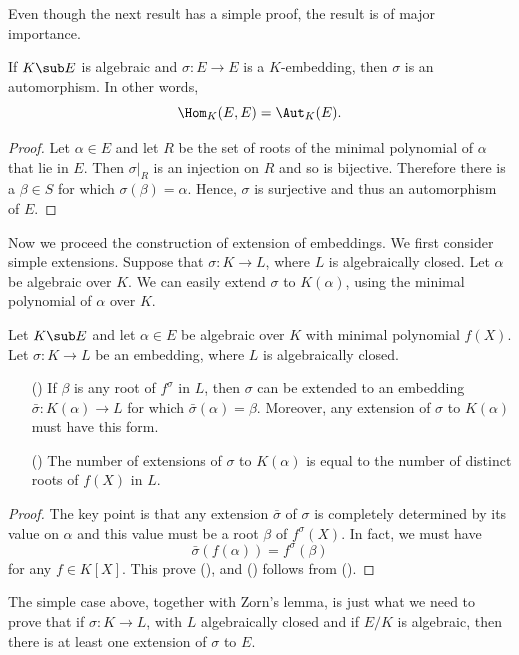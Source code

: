Even though the next result has a simple proof, the result is of major
importance.
\begin{theorem}\label{field ext algebraic Hom=Aut}
If $K\sub E$ is algebraic and $\sigma:E\to E$ is a $K$-embedding, then $\sigma$ is an automorphism. In other words,
\[\Hom_K(E,E)=\Aut_K(E).\]
\end{theorem}
\begin{proof}
Let $\alpha\in E$ and let $R$ be the set of roots of the minimal polynomial of $\alpha$ that lie in $E$. Then $\sigma|_R$ is an injection on $R$ and so is bijective. Therefore there is a $\beta\in S$ for which $\sigma(\beta)=\alpha$. Hence, $\sigma$ is surjective and thus an automorphism of $E$.
\end{proof}
Now we proceed the construction of extension of embeddings. We first consider simple extensions. Suppose that $\sigma:K\to L$, where $L$ is algebraically closed. Let $\alpha$ be algebraic over $K$. We can easily extend $\sigma$ to $K(\alpha)$, using the minimal polynomial of $\alpha$ over $K$.
\begin{proposition}\label{field embedding ext simple case}
Let $K\sub E$ and let $\alpha\in E$ be algebraic over $K$ with minimal polynomial $f(X)$. Let $\sigma:K\to L$ be an embedding, where $L$ is algebraically closed.
\begin{itemize}
\item[(\rmnum{1})] If $\beta$ is any root of $f^\sigma$ in $L$, then $\sigma$ can be extended to an embedding $\bar{\sigma}:K(\alpha)\to L$ for which $\bar{\sigma}(\alpha)=\beta$. Moreover, any extension of $\sigma$ to $K(\alpha)$ must have this form.
\item[(\rmnum{2})] The number of extensions of $\sigma$ to $K(\alpha)$ is equal to the number of distinct roots of $f(X)$ in $L$.
\end{itemize}
\end{proposition}
\begin{proof}
The key point is that any extension $\bar{\sigma}$ of $\sigma$ is completely determined by its value on $\alpha$ and this value must be a root $\beta$ of $f^\sigma(X)$. In fact, we must have
\[\bar{\sigma}(f(\alpha))=f^\sigma(\beta)\]
for any $f\in K[X]$. This prove (), and () follows from ().
\end{proof}
The simple case above, together with Zorn's lemma, is just what we need to prove that if $\sigma:K\to L$, with $L$ algebraically closed and if $E/K$ is algebraic, then there is at least one extension of $\sigma$ to $E$.
